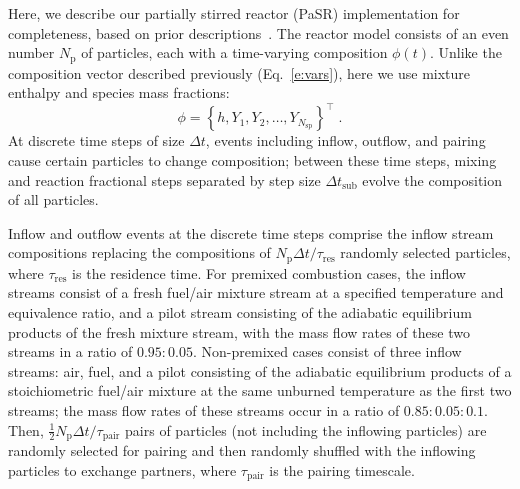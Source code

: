 \documentclass[preprint,12pt]{elsarticle}
\newcommand{ \numsp }{N_{\text{sp}}}
\begin{document}
{Here, we describe our partially stirred reactor (PaSR) implementation for completeness, based on prior descriptions~\cite{Correa:1993ud,Chen:1997ta,Pope:1997wu,Bhave:2004hc,Ren:2004fz,Ren:2014cd}.
The reactor model consists of an even number $N_{\text{p}}$ of particles, each with a time-varying composition $\phi (t)$.
Unlike the composition vector described previously (Eq.~\eqref{e:vars}), here we use mixture enthalpy and species mass fractions:
\begin{equation}
\phi = \left \lbrace h, Y_1, Y_2, \dotsc, Y_{\numsp} \right \rbrace^{\intercal} \;.
\end{equation}
At discrete time steps of size $\Delta t$, events including inflow, outflow, and pairing cause certain particles to change composition; between these time steps, mixing and reaction fractional steps separated by step size $\Delta t_{\text{sub}}$ evolve the composition of all particles.

Inflow and outflow events at the discrete time steps comprise the inflow stream compositions replacing the compositions of $N_{\text{p}} \Delta t / \tau_{\text{res}}$ randomly selected particles, where $\tau_{\text{res}}$ is the residence time.
For premixed combustion cases, the inflow streams consist of a fresh fuel\slash air mixture stream at a specified temperature and equivalence ratio, and a pilot stream consisting of the adiabatic equilibrium products of the fresh mixture stream, with the mass flow rates of these two streams in a ratio of $0.95 \mathbin{:} 0.05$.
Non-premixed cases consist of three inflow streams: air, fuel, and a pilot consisting of the adiabatic equilibrium products of a stoichiometric fuel\slash air mixture at the same unburned temperature as the first two streams; the mass flow rates of these streams occur in a ratio of $0.85 \mathbin{:} 0.05 \mathbin{:} 0.1$.
Then, $\frac{1}{2} N_{\text{p}} \Delta t / \tau_{\text{pair}}$ pairs of particles (not including the inflowing particles) are randomly selected for pairing and then randomly shuffled with the inflowing particles to exchange partners, where $\tau_{\text{pair}}$ is the pairing timescale.

}
\end{document}
